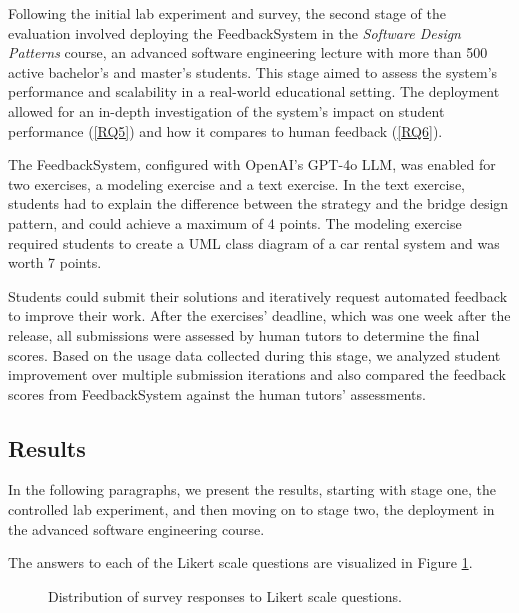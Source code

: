 \documentclass[sigconf,screen,review,anonymous]{acmart}
\begin{document}
Following the initial lab experiment and survey, the second stage of the evaluation involved deploying the FeedbackSystem in the \textit{Software Design Patterns} course, an advanced software engineering lecture with more than 500 active bachelor's and master's students.
This stage aimed to assess the system's performance and scalability in a real-world educational setting.
The deployment allowed for an in-depth investigation of the system's impact on student performance (\ref{RQ5}) and how it compares to human feedback (\ref{RQ6}).

The FeedbackSystem, configured with OpenAI's GPT-4o LLM, was enabled for two exercises, a modeling exercise and a text exercise.
In the text exercise, students had to explain the difference between the strategy and the bridge design pattern, and could achieve a maximum of 4 points.
The modeling exercise required students to create a UML class diagram of a car rental system and was worth 7 points. 

Students could submit their solutions and iteratively request automated feedback to improve their work.
After the exercises' deadline, which was one week after the release, all submissions were assessed by human tutors to determine the final scores.
Based on the usage data collected during this stage, we analyzed student improvement over multiple submission iterations and also compared the feedback scores from FeedbackSystem against the human tutors' assessments. 


\subsection{Results}

In the following paragraphs, we present the results, starting with stage one, the controlled lab experiment, and then moving on to stage two, the deployment in the advanced software engineering course.

The answers to each of the Likert scale questions are visualized in Figure \ref{fig:Survey-Results}.

\begin{figure}[htpb]
  \centering
  \resizebox{\linewidth}{!}{
    
  }
  \caption{Distribution of survey responses to Likert scale questions.}
  \label{fig:Survey-Results}
  \vspace{-2mm}
\end{figure}
\end{document}

